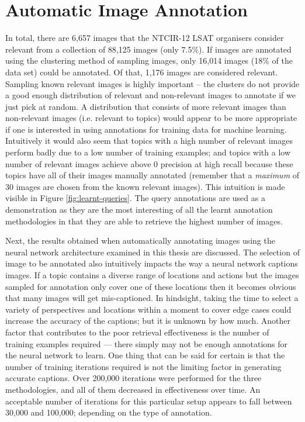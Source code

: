 \section{Automatic Image Annotation}

In total, there are 6,657 images that the NTCIR-12 LSAT organisers consider relevant from a collection of 88,125 images (only 7.5\%). If images are annotated using the clustering method of sampling images, only 16,014 images (18\% of the data set) could be annotated. Of that, 1,176 images are considered relevant. Sampling known relevant images is highly important -- the clusters do not provide a good enough distribution of relevant and non-relevant images to annotate if we just pick at random. A distribution that consists of more relevant images than non-relevant images (i.e. relevant to topics) would appear to be more appropriate if one is interested in using annotations for training data for machine learning. Intuitively it would also seem that topics with a high number of relevant images perform badly due to a low number of training examples; and topics with a low number of relevant images achieve above $0$ precision at high recall because these topics have all of their images manually annotated (remember that a \textit{maximum} of $30$ images are chosen from the known relevant images). This intuition is made visible in Figure \ref{fig:learnt-queries}. The query annotations are used as a demonstration as they are the most interesting of all the learnt annotation methodologies in that they are able to retrieve the highest number of images.

Next, the results obtained when automatically annotating images using the neural network architecture examined in this thesis are discussed. The selection of image to be annotated also intuitively impacts the way a neural network captions images. If a topic contains a diverse range of locations and actions but the images sampled for annotation only cover one of these locations then it becomes obvious that many images will get mis-captioned. In hindsight, taking the time to select a variety of perspectives and locations within a moment to cover edge cases could increase the accuracy of the captions; but it is unknown by how much. Another factor that contributes to the poor retrieval effectiveness is the number of training examples required --- there simply may not be enough annotations for the neural network to learn. One thing that can be said for certain is that the number of training iterations required is not the limiting factor in generating accurate captions. Over 200,000 iterations were performed for the three methodologies, and all of them decreased in effectiveness over time. An acceptable number of iterations for this particular setup appears to fall between 30,000 and 100,000; depending on the type of annotation.

